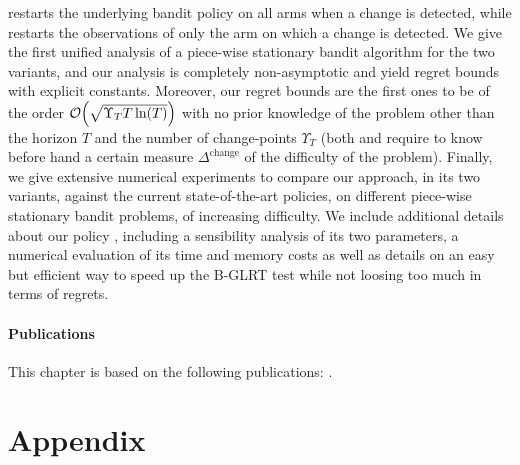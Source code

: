 \MUCB{} restarts the underlying \UCB{} bandit policy on all arms when a change is detected, while \CUSUMUCB{} restarts the observations of only the arm on which a change is detected.
%
We give the first unified analysis of a piece-wise stationary bandit algorithm for the two variants, and our analysis is completely non-asymptotic and yield regret bounds with explicit constants.
Moreover, our regret bounds are the first ones to be of the order $\mathop{}\mathopen{}\mathcal{O}\mathopen{}\left(\sqrt{\Upsilon_T T \ln(T)}\right)$ with no prior knowledge of the problem other than the horizon $T$ and the number of change-points $\Upsilon_T$ (both \MUCB{} and \CUSUMUCB{} require to know before hand a certain measure $\Delta^{\text{change}}$ of the difficulty of the problem).
%
Finally, we give extensive numerical experiments to compare our approach, in its two variants, against the current state-of-the-art policies, on different piece-wise stationary bandit problems, of increasing difficulty.
%
We include additional details about our policy \GLRklUCB, including a sensibility analysis of its two parameters, a numerical evaluation of its time and memory costs as well as details on an easy but efficient way to speed up the B-GLRT test while not loosing too much in terms of regrets.


\vfill{}

\paragraph{Publications}

This chapter is based on the following publications: \cite{Besson2019GLRT,Besson2019Gretsi}.


\newpage
\graphicspath{{2-Chapters/6-Chapter/Images/}}










\section{Appendix}
\label{sec:6:appendix}


